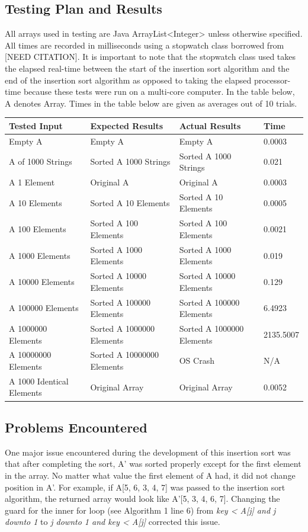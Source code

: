 \documentclass[onecolumn, 12pt, article]{IEEEtran}
\numberwithin{case}{problem}
\numberwithin{condition}{problem}
\numberwithin{condition}{subsection}
\numberwithin{definition}{section}
\theoremstyle{remark}
\numberwithin{question}{problem}
\theoremstyle{plain}
\numberwithin{answer}{problem}
\numberwithin{solution}{section}
\numberwithin{equation}{section}%
\begin{document}
\subsection{Testing Plan and Results}
All arrays used in testing are Java ArrayList<Integer> unless otherwise specified. All times are recorded in milliseconds using a stopwatch class borrowed from [NEED CITATION]. %
It is important to note that the stopwatch class used takes the elapsed real-time between the start of the insertion sort algorithm and the end of the insertion sort algorithm as opposed to taking the elapsed processor-time because these tests were run on a multi-core computer. 
In the table below, A denotes Array. Times in the table below are given as averages out of 10 trials.
\newline
{}
\begin{center}
\begin{tabular}{|l|l|l|l|}
\hline Tested Input & Expected Results & Actual Results & Time \\
\hline Empty A & Empty A & Empty A & 0.0003 \\
\hline A of 1000 Strings & Sorted A 1000 Strings & Sorted A 1000 Strings & 0.021 \\
\hline A 1 Element & Original A & Original A & 0.0003 \\
\hline A 10 Elements & Sorted A 10 Elements & Sorted A 10 Elements & 0.0005 \\
\hline A 100 Elements & Sorted A 100 Elements & Sorted A 100 Elements & 0.0021 \\
\hline A 1000 Elements & Sorted A 1000 Elements & Sorted A 1000 Elements & 0.019 \\
\hline A 10000 Elements & Sorted A 10000 Elements & Sorted A 10000 Elements & 0.129 \\
\hline A 100000 Elements & Sorted A 100000 Elements & Sorted A 100000 Elements & 6.4923 \\
\hline A 1000000 Elements & Sorted A 1000000 Elements & Sorted A 1000000 Elements & 2135.5007 \\
\hline A 10000000 Elements & Sorted A 10000000 Elements & OS Crash & N/A \\
\hline A 1000 Identical Elements & Original Array & Original Array & 0.0052 \\
\hline
\end{tabular}
\end{center}

\subsection{Problems Encountered}
One major issue encountered during the development of this insertion sort was that after completing the sort, A' was sorted properly except for the first element in the array. No matter what value the first element of A had, it did not change position in A'. For example, if A[5, 6, 3, 4, 7] was passed to the insertion sort algorithm, the returned array would look like A'[5, 3, 4, 6, 7]. Changing the guard for the inner for loop (see Algorithm 1 line 6) from \textit{key < A[j] and j downto 1} to \textit{j downto 1 and key < A[j]} corrected this issue.
\end{document}
